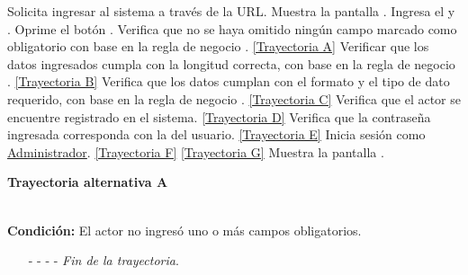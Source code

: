 	\begin{UCtrayectoria}
		\UCpaso[\UCactor] Solicita ingresar al sistema a través de la URL.
		\UCpaso[\UCsist] Muestra la pantalla .
		\UCpaso[\UCactor] Ingresa el  y . \label{P3}
		\UCpaso[\UCactor] Oprime el botón .
		\UCpaso[\UCsist] Verifica que no se haya omitido ningún campo marcado como obligatorio con base en la regla de negocio . \hyperlink{CU1:TAA}{[Trayectoria A]}
		\UCpaso[\UCsist] Verificar que los datos ingresados cumpla con la longitud correcta, con base en la regla de negocio . \hyperlink{CU1:TAB}{[Trayectoria B]}
		\UCpaso[\UCsist] Verifica que los datos cumplan con el formato y el tipo de dato requerido, con base en la regla de negocio . \hyperlink{CU1:TAC}{[Trayectoria C]}
		\UCpaso[\UCsist] Verifica que el actor se encuentre registrado en el sistema. \hyperlink{CU1:TAD}{[Trayectoria D]}
		\UCpaso[\UCsist] Verifica que la contraseña ingresada corresponda con la del usuario. \hyperlink{CU1:TAE}{[Trayectoria E]}
		\UCpaso[\UCsist] Inicia sesión como \hyperlink{admin}{Administrador}. \hyperlink{CU1:TAF}{[Trayectoria F]} \hyperlink{CU1:TAG}{[Trayectoria G]}
		\UCpaso[\UCsist] Muestra la pantalla .
	\end{UCtrayectoria}		
		\hypertarget{CU1:TAA}{\textbf{Trayectoria alternativa A}}\\
		\noindent \textbf{Condición:} El actor no ingresó uno o más campos obligatorios.
		\begin{enumerate}
			\UCpaso[\UCsist] Muestra el mensaje  y señala el campo que presenta el error en la pantalla .
			\UCpaso[\UCactor] Regresa al paso \ref{P3} de la Trayectoria Principal.
			\item[- -] - - {\em {Fin de la trayectoria}}.%
		\end{enumerate}


